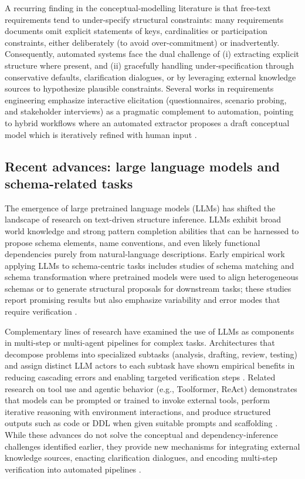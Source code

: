 A recurring finding in the conceptual-modelling literature is that free-text requirements tend to under-specify structural constraints: many requirements documents omit explicit statements of keys, cardinalities or participation constraints, either deliberately (to avoid over-commitment) or inadvertently. Consequently, automated systems face the dual challenge of (i) extracting explicit structure where present, and (ii) gracefully handling under-specification through conservative defaults, clarification dialogues, or by leveraging external knowledge sources to hypothesize plausible constraints. Several works in requirements engineering emphasize interactive elicitation (questionnaires, scenario probing, and stakeholder interviews) as a pragmatic complement to automation, pointing to hybrid workflows where an automated extractor proposes a draft conceptual model which is iteratively refined with human input \cite{ghosh2016}.

\subsection{Recent advances: large language models and schema-related tasks}
\label{sec:llm-schema}

The emergence of large pretrained language models (LLMs) has shifted the landscape of research on text-driven structure inference. LLMs exhibit broad world knowledge and strong pattern completion abilities that can be harnessed to propose schema elements, name conventions, and even likely functional dependencies purely from natural-language descriptions. Early empirical work applying LLMs to schema-centric tasks includes studies of schema matching and schema transformation where pretrained models were used to align heterogeneous schemas or to generate structural proposals for downstream tasks; these studies report promising results but also emphasize variability and error modes that require verification \cite{parciak2024,zhou2024llmstructured}.

Complementary lines of research have examined the use of LLMs as components in multi-step or multi-agent pipelines for complex tasks. Architectures that decompose problems into specialized subtasks (analysis, drafting, review, testing) and assign distinct LLM actors to each subtask have shown empirical benefits in reducing cascading errors and enabling targeted verification steps \cite{autogen,wu2023hugginggpt}. Related research on tool use and agentic behavior (e.g., Toolformer, ReAct) demonstrates that models can be prompted or trained to invoke external tools, perform iterative reasoning with environment interactions, and produce structured outputs such as code or DDL when given suitable prompts and scaffolding \cite{schick23,yao2022react}. While these advances do not solve the conceptual and dependency-inference challenges identified earlier, they provide new mechanisms for integrating external knowledge sources, enacting clarification dialogues, and encoding multi-step verification into automated pipelines \cite{schick23,autogen}.

